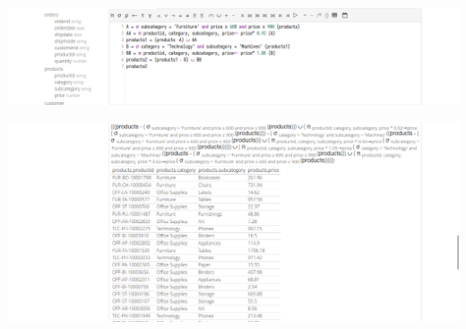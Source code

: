 \documentclass[12pt,a4paper]{article}
\begin{document}
\begin{enumerate}
\begin{enumerate}
				\includegraphics[scale=0.4]{assets/mantenimiento_datos-e1.png}

				\includegraphics[scale=0.4]{assets/mantenimiento_datos-e2.png}
		\end{enumerate}
\end{enumerate}
\end{document}
